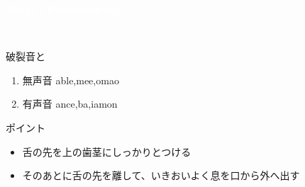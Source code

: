 \documentclass[aspectratio=169,xcolor={dvipsnames,table}]{beamer}
\begin{document}
\begin{frame}
\centering
  \textcolor{white}{\Huge\bfseries Today's Pronunciation}\pause

 \vspace{30pt}

  \textcolor{white}{\Huge\bfseries {}, }

\vfill

\end{frame}
\begin{frame}[plain]{破裂音と}

\large

\begin{enumerate}
 \item  無声音 \hspace{20pt}able,\hspace{1\zw}mee,\hspace{1\zw}omao
 \item  有声音 \hspace{18pt}ance,\hspace{1\zw}ba,\hspace{1\zw}iamon

\end{enumerate}

\vspace*{20pt}

\normalsize
ポイント

\begin{itemize}
 \item 舌の先を上の歯茎にしっかりとつける
 \item そのあとに舌の先を離して、いきおいよく息を口から外へ出す
 \end{itemize}

\hfill{}


\end{frame}
\end{document}
